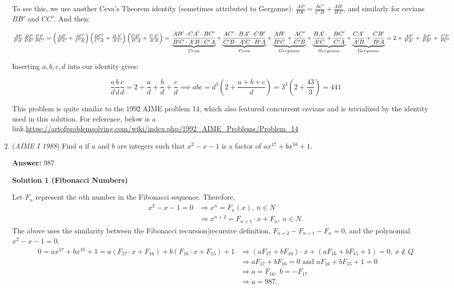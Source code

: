 \begin{enumerate}
 To see this, we use another Ceva's Theorem identity (sometimes attributed to Gergonne): $\frac{AP}{PA'}=\frac{AC'}{C'B}+\frac{AB'}{B'C}$, and similarly for cevians $BB'$ and $CC'$.  And then:

 $\frac{AP}{PA'}\frac{BP}{PB'}\frac{CP}{PC'} =  \left(\frac{AB'}{B'C}+\frac{AC'}{C'B}\right) \left(\frac{BC'}{C'A}+\frac{BA'}{A'C}\right)  \left(\frac{CB'}{B'A}+\frac{CA'}{A'B}\right) = \\ \underbrace{\frac{AB'\cdot CA'\cdot BC'}{B'C\cdot A'B\cdot C'A}}_{Ceva} + \underbrace{\frac{AC'\cdot BA'\cdot CB'}{C'B\cdot A'C\cdot B'A}}_{Ceva} + \underbrace{\frac{AB'}{B'C} + \frac{AC'}{C'B}}_{Gergonne} + \underbrace{\frac{BA'}{A'C} + \frac{BC'}{C'A}}_{Gergonne} + \underbrace{\frac{CA'}{A'B} + \frac{CB'}{B'A}}_{Gergonne} = \\ 2 + \frac{AP}{PA'} + \frac{BP}{PB'} + \frac{CP}{PC'}$

 Inserting $a, b, c, d$ into our identity gives:

 
 \[\frac{a}{d}\frac{b}{d}\frac{c}{d}=2+\frac{a}{d}+\frac{b}{d}+\frac{c}{d}\implies abc=d^3(2+\frac{a+b+c}{d})=3^3(2+\frac{43}{3})=\boxed{441}\]

 This problem is quite similar to the 1992 AIME problem 14, which also featured concurrent cevians and is trivialized by the identity used in this solution. For reference, below is a link.\href{https://artofproblemsolving.com/wiki/index.php/1992\_AIME\_Problems/Problem\_14}{https://artofproblemsolving.com/wiki/index.php/1992\_AIME\_Problems/Problem\_14}

 


	\item (\textit{AIME I 1988}) Find $a$ if $a$ and $b$ are integers such that $x^2 - x - 1$ is a factor of $ax^{17} + bx^{16} + 1$.


 
 \textbf{Answer: }987



\textbf{Solution 1 (Fibonacci Numbers)}

Let $F_n$ represent the $n$th number in the Fibonacci sequence. Therefore,
 \begin{align*} x^2 - x - 1 = 0&\Longrightarrow x^n = F_n(x), \ n\in N \\ &\Longrightarrow x^{n + 2} = F_{n + 1}\cdot x + F_n,\ n\in N. \end{align*}
The above uses the similarity between the Fibonacci recursion|recursive definition, $F_{n+2} - F_{n+1} - F_n = 0$, and the polynomial $x^2 - x - 1 = 0$. 
 \begin{align*} 0 = ax^{17} + bx^{16} + 1 = a(F_{17}\cdot x + F_{16}) + b(F_{16}\cdot x + F_{15}) + 1 &\Longrightarrow (aF_{17} + bF_{16})\cdot x + (aF_{16} + bF_{15} + 1) = 0,\ x\not\in Q \\ &\Longrightarrow aF_{17} + bF_{16} = 0 \text{ and } aF_{16} + bF_{15} + 1 = 0 \\ &\Longrightarrow a = F_{16},\ b = - F_{17} \\ &\Longrightarrow a = \boxed {987}. \end{align*}



\end{enumerate}
